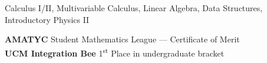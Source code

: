 \documentclass[./Resume.tex]{subfiles}
\begin{document}
	\vspace*{-2mm}
		   \begin{center}
			   Calculus I/II, Multivariable Calculus, Linear Algebra, Data Structures, Introductory Physics II
		   \end{center}
	{\bfseries AMATYC} Student Mathematics League --- Certificate of Merit\\
	{\bfseries UCM Integration Bee} 1\textsuperscript{st} Place in undergraduate bracket
	\vspace*{-2mm}
\end{document}
